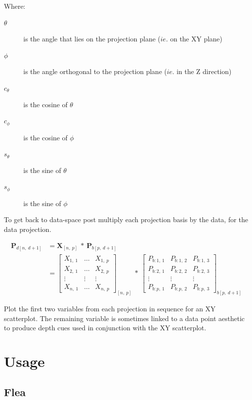 \documentclass{monashthesis}
\begin{document}
Where:

\begin{description}
  \item[$\theta$] is the angle that lies on the projection plane ($ie.$ on the XY plane)
  \item[$\phi$] is the angle orthogonal to the projection plane ($ie.$ in the Z direction)
  \item[$c_\theta$] is the cosine of $\theta$
  \item[$c_\phi$]   is the cosine of $\phi$
  \item[$s_\theta$] is the sine of   $\theta$
  \item[$s_\phi$]   is the sine of   $\phi$
\end{description}

To get back to data-space post multiply each projection basis by the
data, for the data projection.

\begin{align}
  \textbf{P}_{d[n,~d+1]}
    &= \textbf{X}_{[n,~p]} ~*~ \textbf{P}_{b[p,~d+1]} \\
    &= \begin{bmatrix}
      X_{1,~1} & \dots & X_{1,~p} \\
      X_{2,~1} & \dots & X_{2,~p} \\
      \vdots   & \vdots & \vdots  \\
      X_{n,~1} & \dots & X_{n,~p}
    \end{bmatrix}_{[n,~p]}
      ~*~
    \begin{bmatrix}
      P_{b:1,~1} & P_{b:1,~2} & P_{b:1,~3} \\
      P_{b:2,~1} & P_{b:2,~2} & P_{b:2,~3} \\
      \vdots     & \vdots     & \vdots     \\
      P_{b:p,~1} & P_{b:p,~2} & P_{b:p,~3}
    \end{bmatrix}_{b[p,~d+1]}
\end{align}

Plot the first two variables from each projection in sequence for an XY
scatterplot. The remaining variable is sometimes linked to a data point
aesthetic to produce depth cues used in conjunction with the XY
scatterplot.

\section{Usage}\label{usage}

\subsection{Flea}\label{flea}
\end{document}
